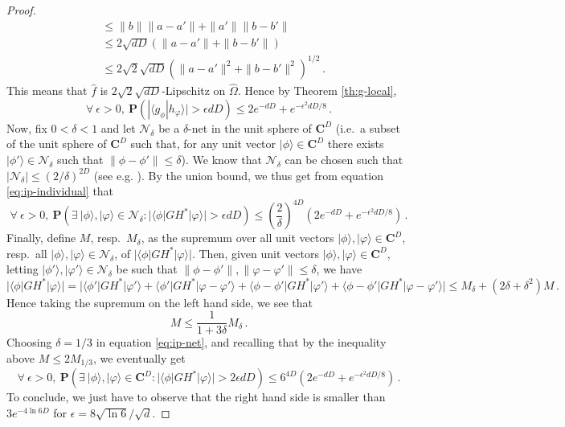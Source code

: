 \documentclass{amsart}
\newcommand{\C}{\mathbf{C}}
\renewcommand{\P}{\mathbf{P}}
\renewcommand{\leq}{\leqslant}
\newcommand{\braket}[2]{\langle #1 | #2\rangle}
\newcommand{\bra}[1]{\langle #1 |}
\newcommand{\ket}[1]{| #1 \rangle}
\begin{document}
\begin{proof}
\begin{align*}
                                       & \leq \|b\|\|a-a'\| + \|a'\|\|b-b'\|                                  \\
                                       & \leq 2\sqrt{dD}\left(\|a-a'\|+\|b-b'\|\right)                        \\
                                       & \leq 2\sqrt{2}\sqrt{dD}\left(\|a-a'\|^2+\|b-b'\|^2\right)^{1/2} \, .
    \end{align*}
    This means that $\hat{f}$ is $2\sqrt{2}\sqrt{dD}$-Lipschitz on $\hat{\Omega}$. Hence by Theorem \ref{th:g-local},
    \begin{equation} \label{eq:ip-individual} \forall\ \epsilon>0,\ \P\left( |\braket{g_\phi}{h_\varphi}| > \epsilon dD \right) \leq 2e^{-dD} + e^{-\epsilon^2dD/8} \, .
    \end{equation}
    Now, fix $0<\delta<1$ and let $\mathcal N_\delta$ be a $\delta$-net in the unit sphere of $\C^D$ (i.e.~a subset of the unit sphere of $\C^D$ such that, for any unit vector $\ket{\phi}\in\C^D$ there exists $\ket{\phi'}\in\mathcal N_\delta$ such that $\|\phi-\phi'\|\leq \delta$). We know that $\mathcal N_\delta$ can be chosen such that $|\mathcal N_\delta|\leq (2/\delta)^{2D}$ (see e.g. \cite[Lemma 5.3]{AS}). By the union bound, we thus get from equation \eqref{eq:ip-individual} that
    \begin{equation} \label{eq:ip-net} \forall\ \epsilon>0,\ \P\left( \exists\ \ket{\phi},\ket{\varphi}\in\mathcal N_\delta :  |\bra{\phi}GH^*\ket{\varphi}| > \epsilon dD \right) \leq \left(\frac{2}{\delta}\right)^{4D} \left(2e^{-dD} + e^{-\epsilon^2dD/8} \right) \, .
    \end{equation}
    Finally, define $M$, resp.~$M_\delta$, as the supremum over all unit vectors $\ket{\phi},\ket{\varphi}\in\C^D$, resp.~all $\ket{\phi},\ket{\varphi}\in\mathcal N_\delta$, of $|\bra{\phi}GH^*\ket{\varphi}|$. Then, given unit vectors $\ket{\phi},\ket{\varphi}\in\C^D$, letting $\ket{\phi'},\ket{\varphi'}\in\mathcal N_\delta$ be such that $\|\phi-\phi'\|,\|\varphi-\varphi'\|\leq\delta$, we have
    \[ |\bra{\phi}GH^*\ket{\varphi}| = | \bra{\phi'}GH^*\ket{\varphi'} + \bra{\phi'}GH^*\ket{\varphi-\varphi'} + \bra{\phi-\phi'}GH^*\ket{\varphi'} + \bra{\phi-\phi'}GH^*\ket{\varphi-\varphi'} | \leq M_\delta + (2\delta+\delta^2)M \, . \]
    Hence taking the supremum on the left hand side, we see that
    \[ M \leq \frac{1}{1+3\delta} M_\delta \, . \]
    Choosing $\delta=1/3$ in equation \eqref{eq:ip-net}, and recalling that by the inequality above $M\leq 2M_{1/3}$, we eventually get
    \[ \forall\ \epsilon>0,\ \P\left( \exists\ \ket{\phi},\ket{\varphi}\in\C^D :  |\bra{\phi}GH^*\ket{\varphi}| > 2\epsilon dD \right) \leq 6^{4D} \left(2e^{-dD} + e^{-\epsilon^2dD/8} \right) \, .  \]
    To conclude, we just have to observe that the right hand side is smaller than $3e^{-4\ln 6 D}$ for $\epsilon=8\sqrt{\ln 6}/\sqrt{d}$.
\end{proof}
\end{document}

